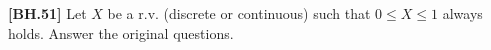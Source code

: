 
\begin{exercise}
	\textbf{[BH.51]} Let $X$ be a r.v. (discrete or continuous) such that $0 \leq X \leq 1$ always holds. Answer the original questions.
\end{exercise}
